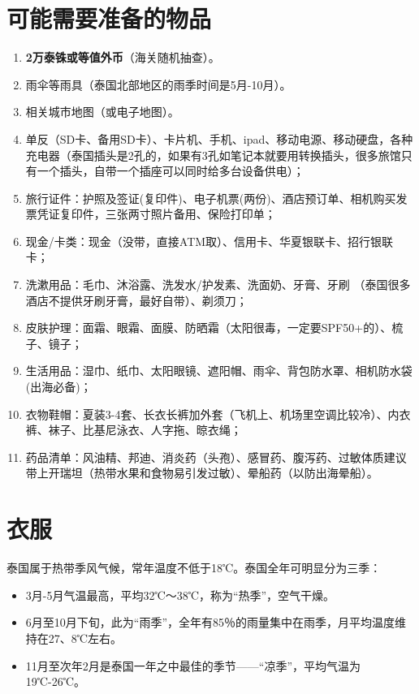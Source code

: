 \documentclass[utf-8,10pt]{ctexart}
\begin{document}
\section{可能需要准备的物品}
\begin{enumerate}
\item \textbf{2万泰铢或等值外币}（海关随机抽查）。
\item 雨伞等雨具（泰国北部地区的雨季时间是5月-10月）。
\item 相关城市地图（或电子地图）。
\item 单反（SD卡、备用SD卡）、卡片机、手机、ipad、移动电源、移动硬盘，各种充电器（泰国插头是2孔的，如果有3孔如笔记本就要用转换插头，很多旅馆只有一个插头，自带一个插座可以同时给多台设备供电）；
\item 旅行证件：护照及签证(复印件)、电子机票(两份)、酒店预订单、相机购买发票凭证复印件，三张两寸照片备用、保险打印单；
\item 现金/卡类：现金（没带，直接ATM取）、信用卡、华夏银联卡、招行银联卡；
\item 洗漱用品：毛巾、沐浴露、洗发水/护发素、洗面奶、牙膏、牙刷 （泰国很多酒店不提供牙刷牙膏，最好自带）、剃须刀；
\item 皮肤护理：面霜、眼霜、面膜、防晒霜（太阳很毒，一定要SPF50+的）、梳子、镜子；
\item 生活用品：湿巾、纸巾、太阳眼镜、遮阳帽、雨伞、背包防水罩、相机防水袋(出海必备)；
\item 衣物鞋帽：夏装3-4套、长衣长裤加外套（飞机上、机场里空调比较冷）、内衣裤、袜子、比基尼泳衣、人字拖、晾衣绳；
\item 药品清单：风油精、邦迪、消炎药（头孢）、感冒药、腹泻药、过敏体质建议带上开瑞坦（热带水果和食物易引发过敏）、晕船药（以防出海晕船）。
\end{enumerate}
\section{衣服}
泰国属于热带季风气候，常年温度不低于18℃。泰国全年可明显分为三季：
\begin{itemize}
\item 3月-5月气温最高，平均32℃～38℃，称为“热季”，空气干燥。
\item 6月至10月下旬，此为“雨季”，全年有85％的雨量集中在雨季，月平均温度维持在27、8℃左右。
\item 11月至次年2月是泰国一年之中最佳的季节——“凉季”，平均气温为19℃-26℃。
\end{itemize}
\end{document}
